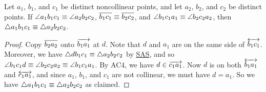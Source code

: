 \begin{prop}
Let \(a_1\), \(b_1\), and \(c_1\) be distinct noncollinear points, and let \(a_2\), \(b_2\), and \(c_2\) be distinct points.
If \(\angle{a_1b_1c_1} \equiv \angle{a_2b_2c_2}\), \(\overline{b_1c_1} \equiv \overline{b_2c_2}\), and \(\angle{b_1c_1a_1} \equiv \angle{b_2c_2a_2}\), then \(\bigtriangleup{a_1b_1c_1} \equiv \bigtriangleup{a_2b_2c_2}\).
\end{prop}

\begin{proof}
Copy \(\overline{b_2a_2}\) onto \(\overrightarrow{b_1a_1}\) at \(d\).
Note that \(d\) and \(a_1\) are on the same side of \(\overleftrightarrow{b_1c_1}\).
Moreover, we have \(\bigtriangleup{db_1c_1} \equiv \bigtriangleup{a_2b_2c_2}\) by \hyperref[prop:sas-theorem]{SAS}, and so \(\angle{b_1c_1d} \equiv \angle{b_2c_2a_2} \equiv \angle{b_1c_1a_1}\).
By AC4, we have \(d \in \overrightarrow{c_1a_1}\).
Now \(d\) is on both \(\overleftrightarrow{b_1a_1}\) and \(\overleftrightarrow{c_1a_1}\), and since \(a_1\), \(b_1\), and \(c_1\) are not collinear, we must have \(d = a_1\).
So we have \(\bigtriangleup{a_1b_1c_1} \equiv \bigtriangleup{a_2b_2c_2}\) as claimed.
\end{proof}
